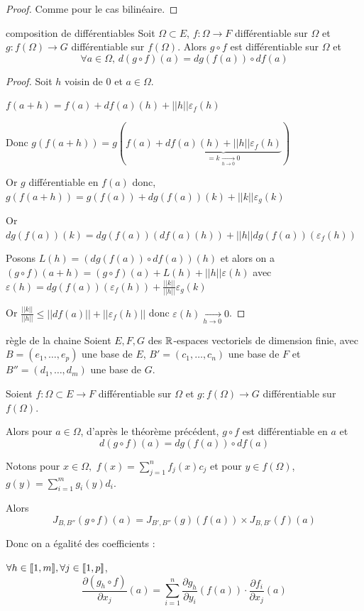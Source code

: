 \begin{proof}
    Comme pour le cas bilinéaire. 
\end{proof}

\begin{proposition}{composition de différentiables}{}
    Soit $\Omega \subset E$, $f : \Omega \to F$ différentiable sur $\Omega$ et
    $g : f(\Omega) \to G$ différentiable sur $f(\Omega)$. Alors 
    $g \circ f$ est différentiable sur $\Omega$ et
    $$\forall a \in \Omega, \, d(g \circ f)(a) = dg(f(a)) \circ df(a)$$
\end{proposition}

\begin{proof}
    Soit $h$ voisin de $0$ et $a \in \Omega$. 

    $f(a + h) = f(a) + df(a)(h) + ||h|| \varepsilon_f(h)$

    Donc $g(f(a + h)) = g(f(a) + \underbrace{df(a)(h) + ||h|| \varepsilon_f(h)}_{ = k \xrightarrow[h \to 0]{} 0})$

    Or $g$ différentiable en $f(a)$ donc, 
    $g(f(a + h)) = g(f(a)) + dg(f(a))(k) + ||k|| \varepsilon_g(k)$

    Or $dg(f(a))(k) = dg(f(a))(df(a)(h)) + ||h|| dg(f(a))(\varepsilon_f(h))$

    Posons $L(h) = (dg(f(a)) \circ df(a))(h)$ et alors on a 
    $(g \circ f)(a + h) = (g \circ f)(a) + L(h) + ||h|| \varepsilon (h)$ avec
    $\varepsilon (h) = dg(f(a))(\varepsilon_f(h)) + \frac{||k||}{||h||} \varepsilon_g(k)$

    Or $\displaystyle \frac{||k||}{||h||} \leqslant ||df(a)|| + ||\varepsilon_f(h)||$ donc
    $\varepsilon (h) \xrightarrow[h \to 0 ]{} 0$.
\end{proof}


\begin{corollaire}{règle de la chaine}{}
    Soient $E, F, G$ des $\mathbb{R}$-espaces vectoriels de dimension finie, avec 
    $B = (e_1, \ldots, e_p)$ une base de $E$, $B' = (c_1, \ldots, c_n)$ une base de $F$
    et $B'' = (d_1, \ldots, d_m)$ une base de $G$.

    Soient $f : \Omega \subset E \to F$ différentiable sur $\Omega$ et
    $g : f(\Omega) \to G$ différentiable sur $f(\Omega)$.

    Alors pour $a \in \Omega$, d'après le théorème précédent, $g \circ f$ est différentiable en $a$
    et 
    $$d(g \circ f)(a) = dg(f(a)) \circ df(a)$$

    Notons pour $x \in \Omega, $ $\displaystyle f(x) = \sum_{j = 1 }^{n } f_j(x) c_j$ et
    pour $y \in f(\Omega)$, $\displaystyle g(y) = \sum_{i = 1 }^{m } g_i(y) d_i$.

    Alors 
    $$J_{B, B''}(g \circ f)(a) = J_{B', B''}(g)(f(a)) \times J_{B, B'}(f)(a)$$

    Donc on a égalité des coefficients : 

    $\forall h \in [\![1, m]\!], \forall j \in [\![1, p]\!]$, 
    $$\frac{\partial (g_h \circ f)}{\partial x_j} (a) = \sum_{i = 1 }^{n } \frac{\partial g_h}{\partial y_i} (f(a)) \cdot \frac{\partial f_i}{\partial x_j} (a)$$
\end{corollaire}

